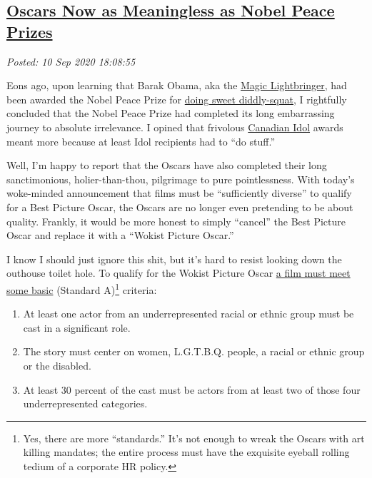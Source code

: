 %

\subsection*{\href{http://analyzethedatanotthedrivel.org/2020/09/10/oscars-now-as-meaningless-as-nobel-peace-prizes/}{Oscars Now as Meaningless as Nobel Peace Prizes}}


\noindent\emph{Posted: 10 Sep 2020 18:08:55}
\vspace{6pt}

Eons ago, upon learning that Barak Obama, aka the
\href{https://www.nationalreview.com/the-campaign-spot/magic-lightbringer-messiah-not-new-terms-obama-jim-geraghty/}{Magic
Lightbringer}, had been awarded the Nobel Peace Prize for
\href{https://analyzethedatanotthedrivel.org/2009/10/09/nobel-peace-prize-idol/}{doing
sweet diddly-squat}, I rightfully concluded that the Nobel Peace Prize
had completed its long embarrassing journey to absolute irrelevance. I
opined that frivolous
\href{https://en.wikipedia.org/wiki/Canadian_Idol}{Canadian Idol} awards
meant more because at least Idol recipients had to ``do stuff.''

Well, I'm happy to report that the Oscars have also completed their long
sanctimonious, holier-than-thou, pilgrimage to pure pointlessness. With
today's woke-minded announcement that films must be ``sufficiently
diverse'' to qualify for a Best Picture Oscar, the Oscars are no longer
even pretending to be about quality. Frankly, it would be more honest to
simply ``cancel'' the Best Picture Oscar and replace it with a ``Wokist
Picture Oscar.''

I know I should just ignore this shit, but it's hard to resist looking
down the outhouse toilet hole. To qualify for the Wokist Picture Oscar
\href{https://www.nytimes.com/2020/09/09/movies/oscars-best-picture-diversity.html}{a
film must meet some basic} (Standard
A)\footnote{Yes, there are more ``standards.'' It's not enough to wreak the Oscars
  with art killing mandates; the entire process must have the exquisite
  eyeball rolling tedium of a corporate HR
  policy.
} criteria: %

\begin{enumerate}
\def\labelenumi{\arabic{enumi}.}
\item
  At least one actor from an underrepresented racial or ethnic group
  must be cast in a significant role.
\item
  The story must center on women, L.G.T.B.Q. people, a racial or ethnic
  group or the disabled.
\item
  At least 30 percent of the cast must be actors from at least two of
  those four underrepresented categories.
\end{enumerate}

